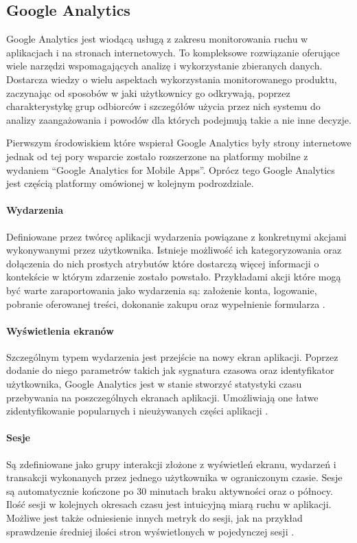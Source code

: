 \subsection{Google Analytics}
\label{sec:ga}
Google Analytics jest wiodącą usługą z zakresu monitorowania ruchu w aplikacjach i na stronach internetowych. To kompleksowe rozwiązanie oferujące wiele narzędzi wspomagających analizę i wykorzystanie zbieranych danych. Dostarcza wiedzy o wielu aspektach wykorzystania monitorowanego produktu, zaczynając od sposobów w jaki użytkownicy go odkrywają, poprzez charakterystykę grup odbiorców i szczegółów użycia przez nich systemu do analizy zaangażowania i powodów dla których podejmują takie a nie inne decyzje.

Pierwszym środowiskiem które wspierał Google Analytics były strony internetowe jednak od tej pory wsparcie zostało rozszerzone na platformy mobilne z wydaniem ``Google Analytics for Mobile Apps''. Oprócz tego Google Analytics jest częścią platformy  omówionej w kolejnym podrozdziale.

\paragraph{Wydarzenia}
\label{par:ga-events}
Definiowane przez twórcę aplikacji wydarzenia powiązane z konkretnymi akcjami wykonywanymi przez użytkownika. Istnieje możliwość ich kategoryzowania oraz dołączenia do nich prostych atrybutów które dostarczą więcej informacji o kontekście w którym zdarzenie zostało powstało. Przykładami akcji które mogą być warte zaraportowania jako wydarzenia są: założenie konta, logowanie, pobranie oferowanej treści, dokonanie zakupu oraz wypełnienie formularza \cite{GA_Events}.

\paragraph{Wyświetlenia ekranów}
Szczególnym typem wydarzenia jest przejście na nowy ekran aplikacji. Poprzez dodanie do niego parametrów takich jak sygnatura czasowa oraz identyfikator użytkownika, Google Analytics jest w stanie stworzyć statystyki czasu przebywania na poszczególnych ekranach aplikacji. Umożliwiają one łatwe zidentyfikowanie popularnych i nieużywanych części aplikacji \cite{GA_Pages}.

\paragraph{Sesje}
Są zdefiniowane jako grupy interakcji złożone z wyświetleń ekranu, wydarzeń i transakcji wykonanych przez jednego użytkownika w ograniczonym czasie. Sesje są automatycznie kończone po 30 minutach braku aktywności oraz o północy. Ilość sesji w kolejnych okresach czasu jest intuicyjną miarą ruchu w aplikacji. Możliwe jest także odniesienie innych metryk do sesji, jak na przykład sprawdzenie średniej ilości stron wyświetlonych w pojedynczej sesji \cite{GA_Sessions}.

